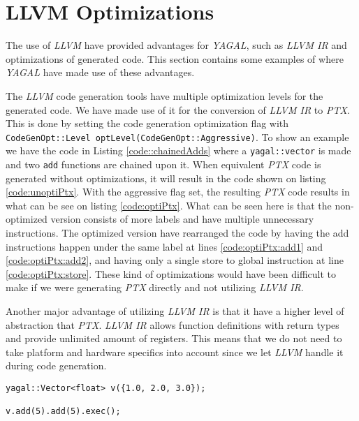 \section{LLVM Optimizations}

The use of \textit{LLVM} have provided advantages for \textit{YAGAL}, such as \textit{LLVM IR} and optimizations of generated code. This section contains some examples of where \textit{YAGAL} have made use of these advantages.

The \textit{LLVM} code generation tools have multiple optimization levels for the generated code. We have made use of it for the conversion of \textit{LLVM IR} to \textit{PTX}. This is done by setting the code generation optimization flag with \texttt{CodeGenOpt::Level optLevel(CodeGenOpt::Aggressive)}. To show an example we have the code in Listing \ref{code::chainedAdds} where a \texttt{yagal::vector} is made and two \texttt{add} functions are chained upon it. When equivalent \textit{PTX} code is generated without optimizations, it will result in the code shown on listing \ref{code:unoptiPtx}. With the aggressive flag set, the resulting \textit{PTX} code results in what can be see on listing \ref{code:optiPtx}. 
What can be seen here is that the non-optimized version consists of more labels and have multiple unnecessary instructions. The optimized version have rearranged the code by having the add instructions happen under the same label at lines \ref{code:optiPtx:add1} and \ref{code:optiPtx:add2}, and having only a single store to global instruction at line \ref{code:optiPtx:store}. These kind of optimizations would have been difficult to make if we were generating \textit{PTX} directly and not utilizing \textit{LLVM IR}.

Another major advantage of utilizing \textit{LLVM IR} is that it have a higher level of abstraction that \textit{PTX}. \textit{LLVM IR} allows function definitions with return types and provide unlimited amount of registers. This means that we do not need to take platform and hardware specifics into account since we let \textit{LLVM} handle it during code generation.

\begin{lstlisting}[caption={Chained \texttt{yagal::vector::add}.}, label={code::chainedAdds}]
yagal::Vector<float> v({1.0, 2.0, 3.0});

v.add(5).add(5).exec();
\end{lstlisting}

